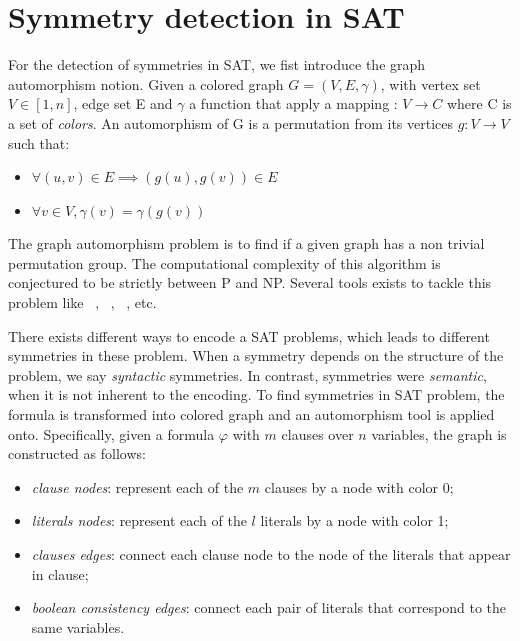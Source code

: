 

\section{Symmetry detection in SAT}

For the detection of symmetries in SAT, we fist introduce the graph automorphism notion.
Given a colored graph $G = (V, E, \gamma)$, with vertex set $V \in  [1, n] $, edge set E and
$\gamma$ a function that apply a mapping : $V \rightarrow C$ where C is a set of \emph{colors}.
An automorphism of G is a permutation from its vertices $g :V \rightarrow V$ 
such that:
\begin{itemize}
	\item $\forall (u, v) \in E \implies (g(u), g(v)) \in E$
	\item $\forall v \in V, \gamma(v) = \gamma(g(v))$
\end{itemize}

The graph automorphism problem is to find if a given graph has a non trivial permutation group. 
The computational complexity of this algorithm is conjectured to be strictly between P and NP.
Several tools exists to tackle this problem like \saucy~\cite{katebi2010symmetry},
\bliss~\cite{JunttilaKaski:ALENEX2007}, \nauty~\cite{mckay2003nauty}, etc.


There exists different ways to encode a SAT problems, which leads to different symmetries in these problem.
When a symmetry depends on the structure of the problem, we say \emph{syntactic} symmetries. 
In contrast, symmetries were \emph{semantic}, when it is not inherent to the encoding.
To find symmetries in SAT problem, the formula is transformed into colored graph
and an automorphism tool is applied onto. Specifically, given a formula $\varphi$ with
$m$ clauses over $n$ variables, the graph is constructed as follows:
\begin{itemize}
	\item \emph{clause nodes}: represent each of the $m$ clauses by a node with color 0;
	\item \emph{literals nodes}: represent each of the $l$ literals by a node with color 1;
	\item \emph{clauses edges}: connect each clause node to the node of the literals that appear in clause;
	\item \emph{boolean consistency edges}: connect each pair of literals that correspond to the same variables.
\end{itemize}


